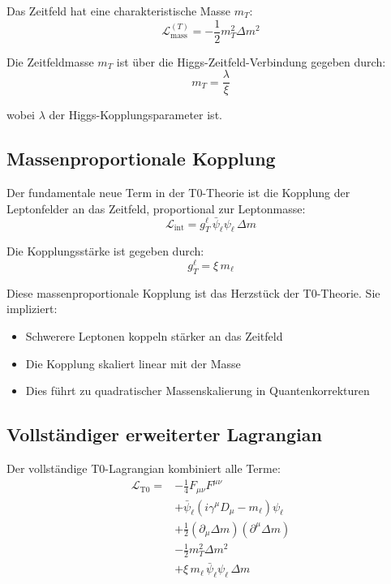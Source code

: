 	Das Zeitfeld hat eine charakteristische Masse $m_T$:
	\begin{equation}
		\mathcal{L}_{\text{mass}}^{(T)} = -\frac{1}{2} m_T^2 \Delta m^2
		\label{eq:time_field_mass}
	\end{equation}
	
	Die Zeitfeldmasse $m_T$ ist über die Higgs-Zeitfeld-Verbindung gegeben durch:
	\begin{equation}
		m_T = \frac{\lambda}{\xi}
		\label{eq:time_field_mass_value}
	\end{equation}
	
	wobei $\lambda$ der Higgs-Kopplungsparameter ist.
	
	\subsection{Massenproportionale Kopplung}
	
	Der fundamentale neue Term in der T0-Theorie ist die Kopplung der Leptonfelder an das Zeitfeld, proportional zur Leptonmasse:
	\begin{equation}
		\mathcal{L}_{\text{int}} = g_T^\ell \, \bar{\psi}_\ell \psi_\ell \, \Delta m
		\label{eq:interaction_term}
	\end{equation}
	
	Die Kopplungsstärke ist gegeben durch:
	\begin{equation}
		\boxed{g_T^\ell = \xi \, m_\ell}
		\label{eq:coupling_strength}
	\end{equation}
	
	Diese massenproportionale Kopplung ist das Herzstück der T0-Theorie. Sie impliziert:
	\begin{itemize}
		\item Schwerere Leptonen koppeln stärker an das Zeitfeld
		\item Die Kopplung skaliert linear mit der Masse
		\item Dies führt zu quadratischer Massenskalierung in Quantenkorrekturen
	\end{itemize}
	
	\subsection{Vollständiger erweiterter Lagrangian}
	
	Der vollständige T0-Lagrangian kombiniert alle Terme:
	\begin{equation}
		\begin{split}
			\mathcal{L}_{\text{T0}} = &-\frac{1}{4} F_{\mu\nu}F^{\mu\nu} \\
			&+ \bar{\psi}_\ell(i\gamma^\mu D_\mu - m_\ell)\psi_\ell \\
			&+ \frac{1}{2}(\partial_\mu \Delta m)(\partial^\mu \Delta m) \\
			&- \frac{1}{2} m_T^2 \Delta m^2 \\
			&+ \xi \, m_\ell \,\bar{\psi}_\ell \psi_\ell \, \Delta m
		\end{split}
		\label{eq:full_lagrangian}
	\end{equation}
	

